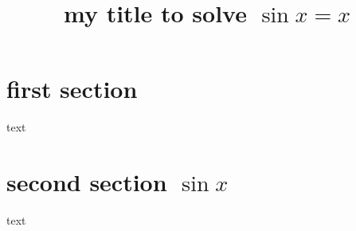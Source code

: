 \documentclass[12pt]{article}
\begin{document}
\title{my title to solve $\sin x = x$}
\tableofcontents

\section{first section}
text

\section{second section $\sin x$}
text
\end{document}
